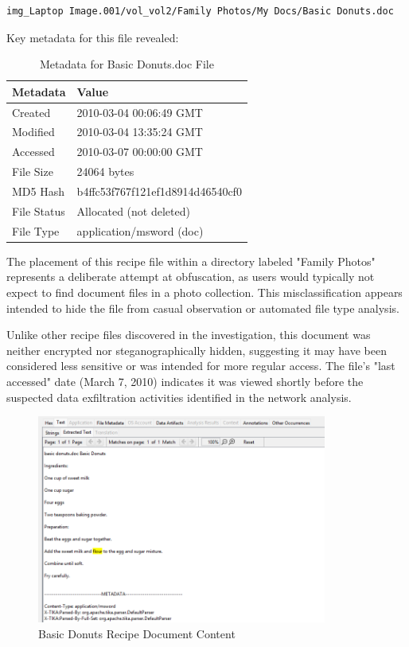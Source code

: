 \begin{verbatim}
img_Laptop Image.001/vol_vol2/Family Photos/My Docs/Basic Donuts.doc
\end{verbatim}

Key metadata for this file revealed:

\begin{table}[htbp]
\centering
\begin{tabular}{|p{3cm}|p{7cm}|}
\hline
\textbf{Metadata} & \textbf{Value} \\
\hline
Created & 2010-03-04 00:06:49 GMT \\
\hline
Modified & 2010-03-04 13:35:24 GMT \\
\hline
Accessed & 2010-03-07 00:00:00 GMT \\
\hline
File Size & 24064 bytes \\
\hline
MD5 Hash & b4ffc53f767f121ef1d8914d46540cf0 \\
\hline
File Status & Allocated (not deleted) \\
\hline
File Type & application/msword (doc) \\
\hline
\end{tabular}
\caption{Metadata for Basic Donuts.doc File}
\label{table:basic_donuts_metadata}
\end{table}

The placement of this recipe file within a directory labeled "Family Photos" represents a deliberate attempt at obfuscation, as users would typically not expect to find document files in a photo collection. This misclassification appears intended to hide the file from casual observation or automated file type analysis.

Unlike other recipe files discovered in the investigation, this document was neither encrypted nor steganographically hidden, suggesting it may have been considered less sensitive or was intended for more regular access. The file's "last accessed" date (March 7, 2010) indicates it was viewed shortly before the suspected data exfiltration activities identified in the network analysis.

\begin{figure}[htbp]
    \centering
    \includegraphics[width=0.85\textwidth]{images/Artifact and Evidence Recovery/BasicDonuts.png}
    \caption{Basic Donuts Recipe Document Content}
    \label{fig:basic_donuts}
\end{figure}


